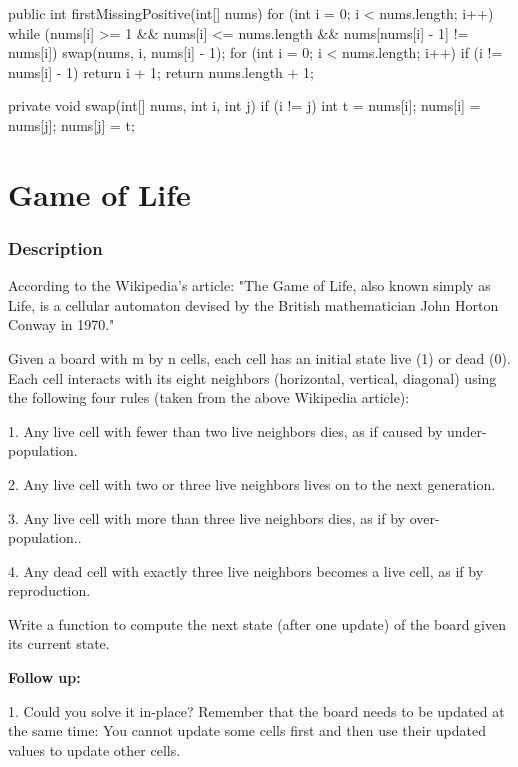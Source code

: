 \begin{Code}
public int firstMissingPositive(int[] nums) {
    for (int i = 0; i < nums.length; i++) {
        while (nums[i] >= 1 && nums[i] <= nums.length && nums[nums[i] - 1] != nums[i]) {
            swap(nums, i, nums[i] - 1);
        }
    }
    for (int i = 0; i < nums.length; i++) {
        if (i != nums[i] - 1) {
            return i + 1;
        }
    }
    return nums.length + 1;
}

private void swap(int[] nums, int i, int j) {
    if (i != j) {
        int t = nums[i];
        nums[i] = nums[j];
        nums[j] = t;
    }
}
\end{Code}

\newpage

\section{Game of Life} %

\subsubsection{Description}
According to the Wikipedia's article: "The Game of Life, also known simply as Life, is a cellular automaton devised by the British mathematician John Horton Conway in 1970."

Given a board with m by n cells, each cell has an initial state live (1) or dead (0). Each cell interacts with its eight neighbors (horizontal, vertical, diagonal) using the following four rules (taken from the above Wikipedia article):

1. Any live cell with fewer than two live neighbors dies, as if caused by under-population.

2. Any live cell with two or three live neighbors lives on to the next generation.

3. Any live cell with more than three live neighbors dies, as if by over-population..

4. Any dead cell with exactly three live neighbors becomes a live cell, as if by reproduction.

Write a function to compute the next state (after one update) of the board given its current state.

\textbf{Follow up:}

1. Could you solve it in-place? Remember that the board needs to be updated at the same time: You cannot update some cells first and then use their updated values to update other cells.

